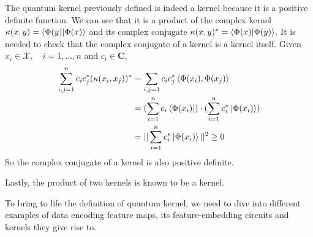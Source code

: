 The quantum kernel previously defined is indeed a kernel because it is a positive definite function. We can see that it is a product of the complex kernel $\kappa(x,y) = \braket{\Phi(y)|\Phi(x)}$ and its complex conjugate $\kappa(x,y)^*=\braket{\Phi(x)|\Phi(y)}$. It is needed to check that the complex conjugate of a kernel is a kernel itself. Given $x_i \in \mathcal{X}, \quad i=1,...,n$ and $c_i \in \mathbf{C}$,
\begin{align}
    \sum_{i,j=1}^n c_i c_j^*(\kappa(x_i,x_j))^* &= \sum_{i,j=1} c_i c_j^* \left< \Phi(x_i), \Phi(x_j)\right> \\
    &= (\sum_{i=1}^n c_i \bra{\Phi(x_i)}) \cdot (\sum_{i=1}^n c_i^* \ket{\Phi(x_i)}) \\
    &= || \sum_{i=1}^n c_i^* \ket{\Phi(x_i)} ||^2 \geq 0
\end{align}
So the complex conjugate of a kernel is also positive definite.

Lastly, the product of two kernels is known to be a kernel.


To bring to life the definition of quantum kernel, we need to dive into different examples of data encoding feature maps, its feature-embedding circuits and kernels they give rise to.

